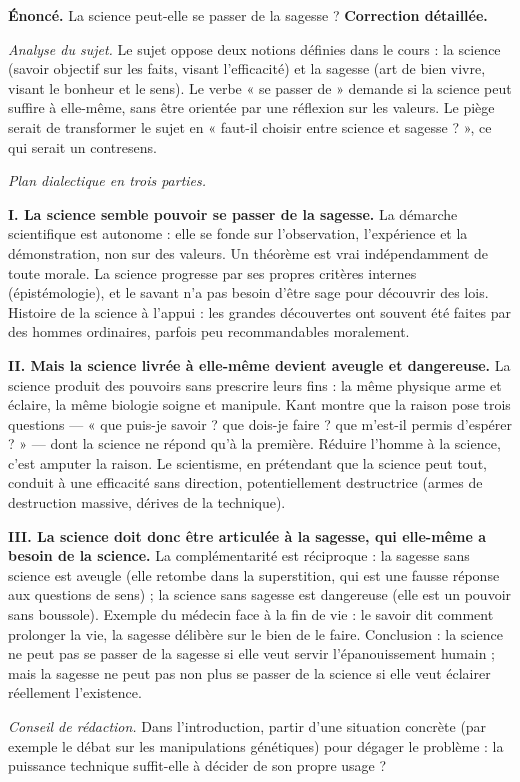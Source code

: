 \documentclass[11pt]{article}
\begin{document}
\begin{exoresolu}
\textbf{Énoncé.} La science peut-elle se passer de la sagesse ?
\tcblower
\textbf{Correction détaillée.}

\emph{Analyse du sujet.} Le sujet oppose deux notions définies dans le cours : la science (savoir objectif sur les faits, visant l'efficacité) et la sagesse (art de bien vivre, visant le bonheur et le sens). Le verbe « se passer de » demande si la science peut suffire à elle-même, sans être orientée par une réflexion sur les valeurs. Le piège serait de transformer le sujet en « faut-il choisir entre science et sagesse ? », ce qui serait un contresens.

\emph{Plan dialectique en trois parties.}

\textbf{I. La science semble pouvoir se passer de la sagesse.} La démarche scientifique est autonome : elle se fonde sur l'observation, l'expérience et la démonstration, non sur des valeurs. Un théorème est vrai indépendamment de toute morale. La science progresse par ses propres critères internes (épistémologie), et le savant n'a pas besoin d'être sage pour découvrir des lois. Histoire de la science à l'appui : les grandes découvertes ont souvent été faites par des hommes ordinaires, parfois peu recommandables moralement.

\textbf{II. Mais la science livrée à elle-même devient aveugle et dangereuse.} La science produit des pouvoirs sans prescrire leurs fins : la même physique arme et éclaire, la même biologie soigne et manipule. Kant montre que la raison pose trois questions — « que puis-je savoir ? que dois-je faire ? que m'est-il permis d'espérer ? » — dont la science ne répond qu'à la première. Réduire l'homme à la science, c'est amputer la raison. Le scientisme, en prétendant que la science peut tout, conduit à une efficacité sans direction, potentiellement destructrice (armes de destruction massive, dérives de la technique).

\textbf{III. La science doit donc être articulée à la sagesse, qui elle-même a besoin de la science.} La complémentarité est réciproque : la sagesse sans science est aveugle (elle retombe dans la superstition, qui est une fausse réponse aux questions de sens) ; la science sans sagesse est dangereuse (elle est un pouvoir sans boussole). Exemple du médecin face à la fin de vie : le savoir dit comment prolonger la vie, la sagesse délibère sur le bien de le faire. Conclusion : la science ne peut pas se passer de la sagesse si elle veut servir l'épanouissement humain ; mais la sagesse ne peut pas non plus se passer de la science si elle veut éclairer réellement l'existence.

\emph{Conseil de rédaction.} Dans l'introduction, partir d'une situation concrète (par exemple le débat sur les manipulations génétiques) pour dégager le problème : la puissance technique suffit-elle à décider de son propre usage ?
\end{exoresolu}
\end{document}
